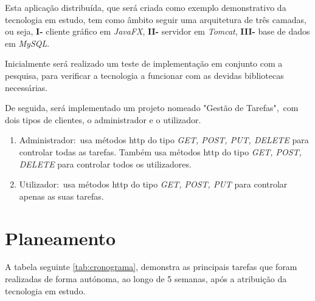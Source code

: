 \noindent Esta aplicação distribuída, que será criada como exemplo demonstrativo da tecnologia em estudo, tem como âmbito seguir uma arquitetura de três camadas, ou seja, \textbf{I-} cliente gráfico em \textit{JavaFX},  \textbf{II-} servidor em \textit{Tomcat},  \textbf{III-} base de dados em \textit{MySQL}.

\noindent Inicialmente será realizado um teste de implementação em conjunto com a pesquisa, para verificar a tecnologia a funcionar com as devidas bibliotecas necessárias.

\noindent De seguida, será implementado um projeto nomeado "Gestão de Tarefas",~com dois tipos de clientes, o administrador e o utilizador.

\begin {enumerate}
\item Administrador:~usa métodos \ac{http} do tipo \textit{GET, POST, PUT, DELETE}  para controlar todas as tarefas.
Também usa métodos \ac{http} do tipo \textit{GET, POST, DELETE} para controlar todos os utilizadores.
\item Utilizador:~usa métodos \ac{http} do tipo \textit{GET, POST, PUT}  para controlar apenas as suas tarefas.
\end {enumerate}

\section{Planeamento}
\label{sec:Ch1.3}

A tabela seguinte \ref{tab:cronograma}, demonstra as principais tarefas que foram realizadas de forma autónoma, ao longo de 5 semanas, após a atribuição da tecnologia em estudo.

\newcommand{\ativo}[1]{\cellcolor{#1}1}


